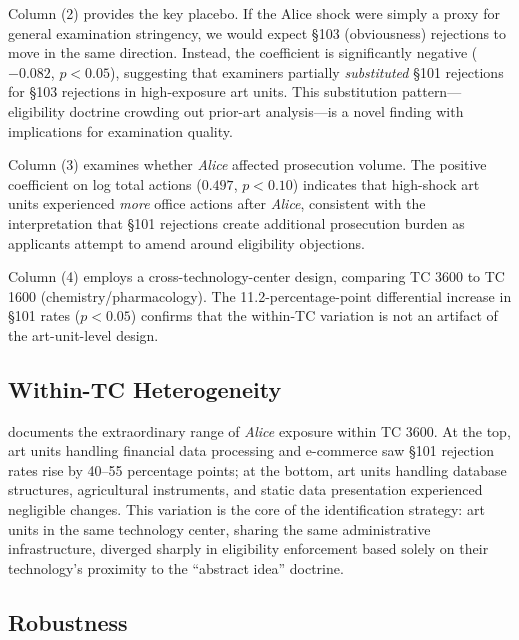 \documentclass[12pt]{article}
\begin{document}
Column (2) provides the key placebo. If the Alice shock were simply a proxy for general examination stringency, we would expect \S103 (obviousness) rejections to move in the same direction. Instead, the coefficient is significantly negative ($-0.082$, $p < 0.05$), suggesting that examiners partially \textit{substituted} \S101 rejections for \S103 rejections in high-exposure art units. This substitution pattern---eligibility doctrine crowding out prior-art analysis---is a novel finding with implications for examination quality.

Column (3) examines whether \textit{Alice} affected prosecution volume. The positive coefficient on log total actions ($0.497$, $p < 0.10$) indicates that high-shock art units experienced \textit{more} office actions after \textit{Alice}, consistent with the interpretation that \S101 rejections create additional prosecution burden as applicants attempt to amend around eligibility objections.

Column (4) employs a cross-technology-center design, comparing TC 3600 to TC 1600 (chemistry/pharmacology). The 11.2-percentage-point differential increase in \S101 rates ($p < 0.05$) confirms that the within-TC variation is not an artifact of the art-unit-level design.



\subsection{Within-TC Heterogeneity}

 documents the extraordinary range of \textit{Alice} exposure within TC 3600. At the top, art units handling financial data processing and e-commerce saw \S101 rejection rates rise by 40--55 percentage points; at the bottom, art units handling database structures, agricultural instruments, and static data presentation experienced negligible changes. This variation is the core of the identification strategy: art units in the same technology center, sharing the same administrative infrastructure, diverged sharply in eligibility enforcement based solely on their technology's proximity to the ``abstract idea'' doctrine.



\subsection{Robustness}
\end{document}
